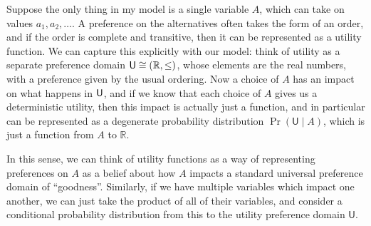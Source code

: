 \documentclass{article}
\begin{document}
	Suppose the only thing in my model is a single variable $A$, which can take on values $a_1, a_2, \ldots$. A preference on the alternatives often takes the form of an order, and if the order is complete and transitive, then it can be represented as a utility function. We can capture this explicitly with our model: think of utility as a separate preference domain $\sf U \cong (\mathbb R, \leq)$, whose elements are the real numbers, with a preference given by the usual ordering. Now a choice of $A$ has an impact on what happens in $\sf U$, and if we know that each choice of $A$ gives us a deterministic utility, then this impact is actually just a function, and in particular can be represented as a degenerate probability distribution $\Pr( \mathsf U \mid A)$, which is just a function from $A$ to $\mathbb R$.
	
	\begin{center}
	\end{center}
	
	In this sense, we can think of utility functions as a way of representing preferences on $A$ as a belief about how $A$ impacts a standard universal preference domain of ``goodness''. Similarly, if we have multiple variables which impact one another, we can just take the product of all of their variables, and consider a conditional probability distribution from this to the utility preference domain $\mathsf U $.
	
\end{document}
